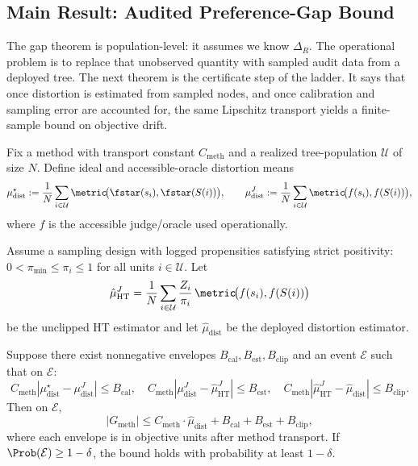 \subsection{Main Result: Audited Preference-Gap Bound}

The gap theorem is population-level: it assumes we know $\Delta_R$. The operational problem is to replace that unobserved quantity with sampled audit data from a deployed tree. The next theorem is the certificate step of the ladder. It says that once distortion is estimated from sampled nodes, and once calibration and sampling error are accounted for, the same Lipschitz transport yields a finite-sample bound on objective drift.

\begin{theorem}\label{thm:e2e}
Fix a method with transport constant $C_{\mathrm{meth}}$ and a realized tree-population $\mathcal{U}$ of size $N$. Define ideal and accessible-oracle distortion means
\[
\mu_{\mathrm{dist}}^{\star}:=\frac{1}{N}\sum_{i\in\mathcal{U}} \metric\!\big(\fstar(s_i),\fstar(S(i))\big),\qquad
\mu_{\mathrm{dist}}^{J}:=\frac{1}{N}\sum_{i\in\mathcal{U}} \metric\!\big(f(s_i),f(S(i))\big),
\]
where $f$ is the accessible judge/oracle used operationally.

Assume a sampling design with logged propensities satisfying strict positivity: $0 < \pi_{\min} \le \pi_i \le 1$ for all units $i \in \mathcal{U}$. Let
\[
\hat{\mu}_{\mathrm{HT}}^{J}=\frac{1}{N}\sum_{i\in\mathcal{U}}\frac{Z_i}{\pi_i}\,\metric\!\big(f(s_i),f(S(i))\big)
\]
be the unclipped HT estimator and let $\hat{\mu}_{\mathrm{dist}}$ be the deployed distortion estimator.

Suppose there exist nonnegative envelopes $B_{\mathrm{cal}}, B_{\mathrm{est}}, B_{\mathrm{clip}}$ and an event $\mathcal{E}$ such that on $\mathcal{E}$:
\[
C_{\mathrm{meth}}\!\left|\mu_{\mathrm{dist}}^{\star}-\mu_{\mathrm{dist}}^{J}\right|\le B_{\mathrm{cal}},\quad
C_{\mathrm{meth}}\!\left|\mu_{\mathrm{dist}}^{J}-\hat{\mu}_{\mathrm{HT}}^{J}\right|\le B_{\mathrm{est}},\quad
C_{\mathrm{meth}}\!\left|\hat{\mu}_{\mathrm{HT}}^{J}-\hat{\mu}_{\mathrm{dist}}\right|\le B_{\mathrm{clip}}.
\]
Then on $\mathcal{E}$,
\[
|G_{\mathrm{meth}}| \le C_{\mathrm{meth}} \cdot \hat{\mu}_{\mathrm{dist}} + B_{\mathrm{cal}} + B_{\mathrm{est}} + B_{\mathrm{clip}},
\]
where each envelope is in objective units after method transport. If $\Prob(\mathcal{E})\ge 1-\delta$, the bound holds with probability at least $1-\delta$.
\end{theorem}

